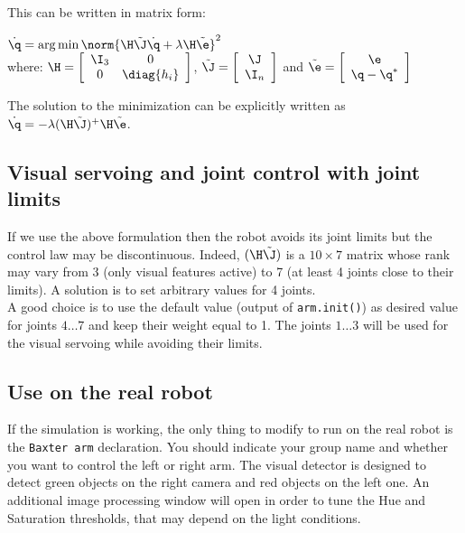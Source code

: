 \documentclass{ecnreport}
\begin{document}
This can be written in matrix form: 
\begin{center}
	$\dot \q = \arg\min \norm{\H\tilde\J\dot \q + \lambda\H\tilde\e}^2$ \\
 where: $\H = \left[\begin{array}{cc}\I_3 & 0 \\ 0 & \diag{h_i}\end{array}\right]$,
 $\tilde\J = \left[\begin{array}{c}\J \\ \I_n \end{array}\right]$ and
  $\tilde\e = \left[\begin{array}{c}\e \\ \q - \q^* \end{array}\right]$
\end{center}
The solution to the minimization can be explicitly written as $\dot \q = -\lambda(\H\tilde\J)^+\H\tilde\e$.\\

\subsection{Visual servoing and joint control with joint limits }

If we use the above formulation then the robot avoids its joint limits but the control law may be discontinuous. Indeed, $(\H\tilde\J)$ is a $10\times 7$ matrix whose rank may vary from 3 (only visual features active) to 7 (at least 4 joints close to their limits). A solution is to set arbitrary values for 4 joints. \\

A good choice is to use the default value (output of \texttt{arm.init()}) as desired value for joints $4\hdots7$ and keep their weight equal to 1. 
The joints $1\hdots 3$ will be used for the visual servoing while avoiding their limits.

\subsection{Use on the real robot}

If the simulation is working, the only thing to modify to run on the real robot is the \texttt{Baxter arm} declaration. You should indicate your group name and whether you want to control the left or right arm. The visual detector is designed to detect green objects on the right camera and red objects on the left one. An additional image processing window will open in order to tune the Hue and Saturation thresholds, that may depend on the light conditions.\\
\end{document}

